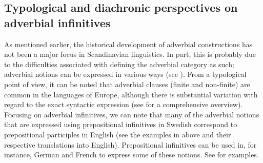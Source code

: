 \documentclass[output=paper]{langscibook}
\begin{document}
\subsection{Typological and diachronic perspectives on adverbial infinitives}\label{sec:kalm:3.2}

As mentioned earlier, the historical development of adverbial constructions has not been a major focus in Scandinavian linguistics. In part, this is probably due to the difficulties associated with defining the adverbial category as such; adverbial notions can be expressed in various ways (see \citealt[3]{Van_der_auwera1998}). From a typological point of view, it can be noted that adverbial clauses (finite and non-finite) are common in the languages of Europe, although there is substantial variation with regard to the exact syntactic expression (see \citealt{Hengenveld1998} for a comprehensive overview). Focusing on adverbial infinitives, we can note that many of the adverbial notions that are expressed using prepositional infinitives in Swedish correspond to prepositional participles in English (see the examples in  above and their respective translations into English). Prepositional infinitives can be used in, for instance, German and French to express some of these notions. See  for examples. 
\end{document}
